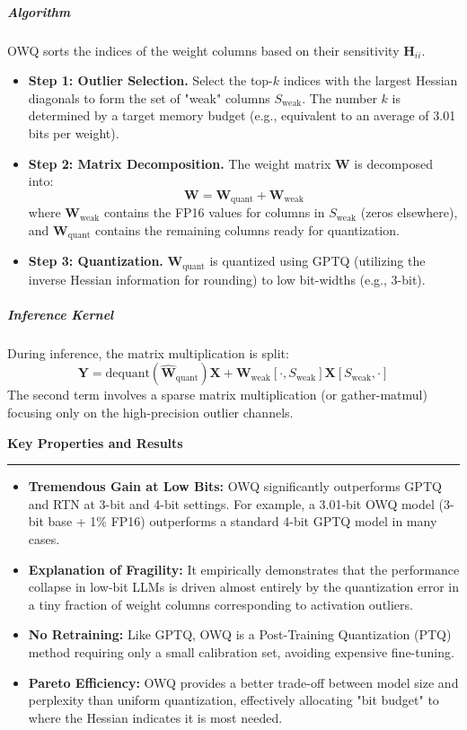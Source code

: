 \documentclass[11pt,a4paper]{article}
\newcommand{\problemp}[1]{%
  \par\medskip
  {\noindent\bfseries\normalsize\color{signcol}#1\par}%
  \vspace{0.4ex}%
  {\noindent\color{softgray}\rule{\linewidth}{0.6pt}\par}%
  \vspace{0.8ex}%
}
\theoremstyle{definition}
\begin{document}
\subparagraph{Algorithm}
OWQ sorts the indices of the weight columns based on their sensitivity $\bm{H}_{ii}$.
\begin{itemize}
  \item \textbf{Step 1: Outlier Selection.} Select the top-$k$ indices with the largest Hessian diagonals to form the set of "weak" columns $S_{\text{weak}}$. The number $k$ is determined by a target memory budget (e.g., equivalent to an average of 3.01 bits per weight).
  \item \textbf{Step 2: Matrix Decomposition.} The weight matrix $\bm{W}$ is decomposed into:
    \begin{equation}
      \bm{W} = \bm{W}_{\text{quant}} + \bm{W}_{\text{weak}}
    \end{equation}
    where $\bm{W}_{\text{weak}}$ contains the FP16 values for columns in $S_{\text{weak}}$ (zeros elsewhere), and $\bm{W}_{\text{quant}}$ contains the remaining columns ready for quantization.
  \item \textbf{Step 3: Quantization.} $\bm{W}_{\text{quant}}$ is quantized using GPTQ (utilizing the inverse Hessian information for rounding) to low bit-widths (e.g., 3-bit).
\end{itemize}

\subparagraph{Inference Kernel}
During inference, the matrix multiplication is split:
\begin{equation}
  \bm{Y} = \text{dequant}(\hat{\bm{W}}_{\text{quant}}) \bm{X} + \bm{W}_{\text{weak}}[\cdot, S_{\text{weak}}] \bm{X}[S_{\text{weak}}, \cdot]
\end{equation}
The second term involves a sparse matrix multiplication (or gather-matmul) focusing only on the high-precision outlier channels.

\problemp{Key Properties and Results}
\begin{itemize}
  \item \textbf{Tremendous Gain at Low Bits:} OWQ significantly outperforms GPTQ and RTN at 3-bit and 4-bit settings. For example, a 3.01-bit OWQ model (3-bit base + 1\% FP16) outperforms a standard 4-bit GPTQ model in many cases.
  \item \textbf{Explanation of Fragility:} It empirically demonstrates that the performance collapse in low-bit LLMs is driven almost entirely by the quantization error in a tiny fraction of weight columns corresponding to activation outliers.
  \item \textbf{No Retraining:} Like GPTQ, OWQ is a Post-Training Quantization (PTQ) method requiring only a small calibration set, avoiding expensive fine-tuning.
  \item \textbf{Pareto Efficiency:} OWQ provides a better trade-off between model size and perplexity than uniform quantization, effectively allocating "bit budget" to where the Hessian indicates it is most needed.
\end{itemize}
\end{document}
